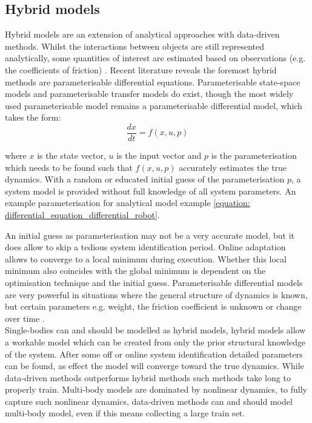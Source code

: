 \subsection{Hybrid models}
\label{subsection: hybrid_models}
Hybrid models are an extension of analytical approaches with data-driven methods. Whilst the interactions between objects are still represented analytically, some quantities of interest are estimated based on observations (e.g. the coefficients of friction) \cite{stuber_lets_2020}. Recent literature reveals the foremost hybrid methods are parameterisable differential equations. Parameterisable state-space models and parameterisable transfer models do exist, though the most widely used parameterisable model remains a parameterisable differential model, which takes the form:
\begin{equation}
   \frac{dx}{dt}=f(x, u, p) 
   \label{equation: parameterisable_model}
\end{equation}

where $x$ is the state vector, $u$ is the input vector and $p$ is the parameterisation which needs to be found such that $f(x,u,p)$ accurately estimates the true dynamics. With a random or educated initial guess of the parameterisation $p$, a system model is provided without full knowledge of all system parameters. An example parameterisation for analytical model example \cref{equation: differential_equation_differential_robot}.


An initial guess as parameterisation may not be a very accurate model, but it does allow to skip a tedious system identification period. Online adaptation allows to converge to a local minimum during execution. Whether this local minimum also coincides with the global minimum is dependent on the optimisation technique and the initial guess. Parameterisable differential models are very powerful in situations where the general structure of dynamics is known, but certain parameters e.g. weight, the friction coefficient is unknown or change over time \cite{seegmiller_vehicle_2013}.\\

Single-bodies can and should be modelled as hybrid models, hybrid models allow a workable model which can be created from only the prior structural knowledge of the system. After some off or online system identification detailed parameters can be found, as effect the model will converge toward the true dynamics. While data-driven methods outperforms hybrid methods such methods take long to properly train. Multi-body models are dominated by nonlinear dynamics, to fully capture such nonlinear dynamics, data-driven methods can and should model multi-body model, even if this means collecting a large train set. 

